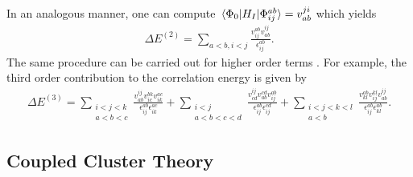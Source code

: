 \documentclass[10pt]{article}
\begin{document}
In an analogous manner, one can compute $\mel*{\Phi_0}{H_I}{\Phi^{ab}_{ij}}=v^{ji}_{ab}$ which yields
\begin{align}
\label{final_delta_e2}
\Delta E^{(2)}=
\sum_{a<b,i<j}\frac{v^{ab}_{ij}v^{ij}_{ab}}{\epsilon^{ab}_{ij}}.
\end{align}
The same procedure can be carried out for higher order terms \cite{higher_terms}. For example, the third order contribution to the correlation energy is given by
\begin{align}
\label{final_delta_e3}
\Delta E^{(3)}
=
\sum_{\substack{i<j<k \\ a<b<c}}
\frac{v^{ij}_{ab}v^{bk}_{ic}v^{ac}_{ik}}{\epsilon^{ab}_{ij}\epsilon^{ac}_{ik}}
+
\sum_{\substack{i<j \\ a<b<c<d}}
\frac{v^{ij}_{cd}v^{cd}_{ab}v^{ab}_{ij}}{\epsilon^{ab}_{ij}\epsilon^{cd}_{ij}}
+
\sum_{\substack{i<j<k<l \\ a<b}}
\frac{v^{ab}_{kl}v^{kl}_{ij}v^{ij}_{ab}}{\epsilon^{ab}_{ij}\epsilon^{ab}_{kl}}.
\end{align}

\subsection{Coupled Cluster Theory}
\end{document}
